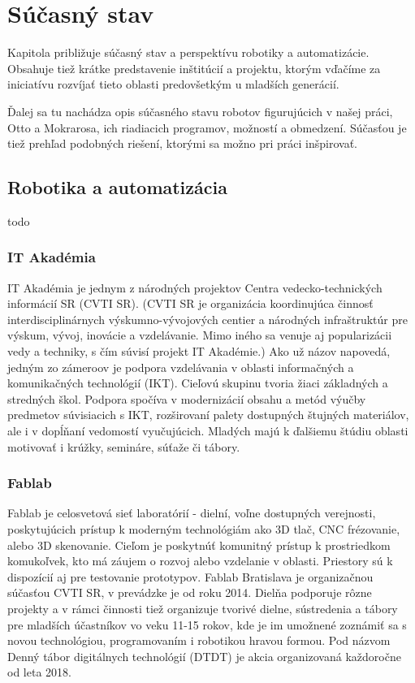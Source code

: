 \chapter{Súčasný stav}

\label{kap:vychodisko}

Kapitola približuje súčasný stav a perspektívu robotiky a automatizácie. Obsahuje tiež krátke predstavenie inštitúcií a projektu, ktorým vďačíme za iniciatívu rozvíjať tieto oblasti predovšetkým u mladších generácií.

Ďalej sa tu nachádza opis súčasného stavu robotov figurujúcich v našej práci, Otto a Mokrarosa, ich riadiacich programov, možností a obmedzení. Súčasťou je tiež prehľad podobných riešení, ktorými sa možno pri práci inšpirovať. 

\section{Robotika a automatizácia}
todo

\subsection{IT Akadémia}
IT Akadémia je jednym z národných projektov Centra vedecko-technických informácií SR (CVTI SR). \cite{CVTISR-ITAkademia} (CVTI SR je organizácia koordinujúca činnosť interdisciplinárnych výskumno-vývojových centier a národných infraštruktúr pre výskum, vývoj, inovácie a vzdelávanie. \cite{CVTISR} Mimo iného sa venuje aj popularizácii vedy a techniky, s čím súvisí projekt IT Akadémie.) Ako už názov napovedá, jedným zo zámeroov je podpora vzdelávania v oblasti informačných a komunikačných technológií (IKT). Cieľovú skupinu tvoria žiaci základných a stredných škol. Podpora spočíva v modernizácií obsahu a metód výučby predmetov súvisiacich s IKT, rozširovaní palety dostupných štujných materiálov, ale i v dopĺňaní vedomostí vyučujúcich. Mladých majú k ďalšiemu štúdiu oblasti motivovať i krúžky, semináre, súťaže či tábory. \cite{ITAkademia}

\subsection{Fablab}
Fablab je celosvetová sieť laboratórií - dielní, voľne dostupných verejnosti, poskytujúcich prístup k moderným technológiám ako 3D tlač, CNC frézovanie, alebo 3D skenovanie. Cieľom je poskytnúť komunitný prístup k prostriedkom komukoľvek, kto má záujem o rozvoj alebo vzdelanie v oblasti. Priestory sú k dispozícií aj pre testovanie prototypov. \cite{Fablab} Fablab Bratislava je organizačnou súčasťou CVTI SR, v prevádzke je od roku 2014. \cite{FablabVedeckyParkUK} Dielňa podporuje rôzne projekty a v rámci činnosti tiež organizuje tvorivé dielne, sústredenia a tábory pre mladších účastníkov vo veku 11-15 rokov, kde je im umožnené zoznámiť sa s novou technológiou, programovaním i robotikou hravou formou. Pod názvom Denný tábor digitálnych technológií (DTDT) je akcia organizovaná každoročne od leta 2018. \cite{FablabDTDT}

